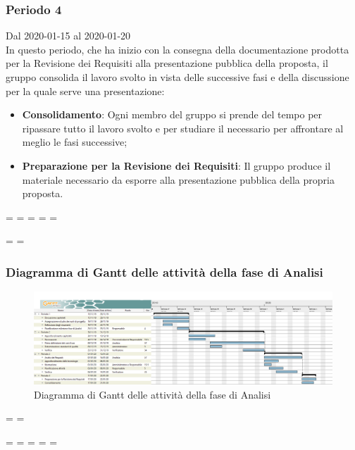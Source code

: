 \subsubsection{Periodo 4} 
Dal 2020-01-15 al 2020-01-20\\
In questo periodo, che ha inizio con la consegna della documentazione prodotta per la Revisione dei Requisiti alla presentazione pubblica della proposta, il gruppo consolida il lavoro svolto in vista delle successive fasi e della discussione per la quale serve una presentazione:
\begin{itemize}
	\item \textbf{Consolidamento}: Ogni membro del gruppo si prende del tempo per ripassare tutto il lavoro svolto e per studiare il necessario per affrontare al meglio le fasi successive;
	\item \textbf{Preparazione per la Revisione dei Requisiti}: Il gruppo produce il materiale necessario da esporre alla presentazione pubblica della propria proposta.
\end{itemize}

\newpage
\paperwidth=\pdfpageheight
\paperheight=\pdfpagewidth
\pdfpageheight=\paperheight
\pdfpagewidth=\paperwidth
\headwidth=\textheight

\begingroup 
\vsize=\textwidth
\hsize=\textheight

\subsubsection{Diagramma di Gantt delle attività della fase di Analisi}
\pagestyle{empty}
\begin{figure}[h]
	\centering	
	\includegraphics[scale=0.40]{Sezioni/DiagrammiGantt/Analisi.png}
	\caption{Diagramma di Gantt delle attività della fase di Analisi}
\end{figure}

\textwidth=\hsize
\textheight=\vsize

\endgroup
\newpage
\paperwidth=\pdfpageheight
\paperheight=\pdfpagewidth
\pdfpageheight=\paperheight
\pdfpagewidth=\paperwidth
\headwidth=\textwidth